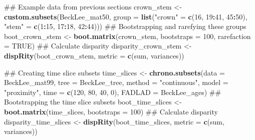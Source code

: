 \documentclass[]{book}
\newenvironment{Shaded}{\begin{snugshade}}{\end{snugshade}}
\newcommand{\KeywordTok}[1]{\textcolor[rgb]{0.13,0.29,0.53}{\textbf{#1}}}
\newcommand{\DataTypeTok}[1]{\textcolor[rgb]{0.13,0.29,0.53}{#1}}
\newcommand{\DecValTok}[1]{\textcolor[rgb]{0.00,0.00,0.81}{#1}}
\newcommand{\StringTok}[1]{\textcolor[rgb]{0.31,0.60,0.02}{#1}}
\newcommand{\OtherTok}[1]{\textcolor[rgb]{0.56,0.35,0.01}{#1}}
\newcommand{\OperatorTok}[1]{\textcolor[rgb]{0.81,0.36,0.00}{\textbf{#1}}}
\newcommand{\NormalTok}[1]{#1}
\theoremstyle{definition}
\theoremstyle{definition}
\theoremstyle{remark}
\begin{document}
\begin{Shaded}
\begin{Highlighting}[]
\NormalTok{## Example data from previous sections}
\NormalTok{crown_stem <-}\StringTok{ }\KeywordTok{custom.subsets}\NormalTok{(BeckLee_mat50,}
                                \DataTypeTok{group =} \KeywordTok{list}\NormalTok{(}\StringTok{"crown"}\NormalTok{ =}\StringTok{ }\KeywordTok{c}\NormalTok{(}\DecValTok{16}\NormalTok{, }\DecValTok{19}\OperatorTok{:}\DecValTok{41}\NormalTok{, }\DecValTok{45}\OperatorTok{:}\DecValTok{50}\NormalTok{), }
                                             \StringTok{"stem"}\NormalTok{ =}\StringTok{ }\KeywordTok{c}\NormalTok{(}\DecValTok{1}\OperatorTok{:}\DecValTok{15}\NormalTok{, }\DecValTok{17}\OperatorTok{:}\DecValTok{18}\NormalTok{, }\DecValTok{42}\OperatorTok{:}\DecValTok{44}\NormalTok{)))}
\NormalTok{## Bootstrapping and rarefying these groups}
\NormalTok{boot_crown_stem <-}\StringTok{ }\KeywordTok{boot.matrix}\NormalTok{(crown_stem, }\DataTypeTok{bootstraps =} \DecValTok{100}\NormalTok{, }\DataTypeTok{rarefaction =} \OtherTok{TRUE}\NormalTok{)}
\NormalTok{## Calculate disparity}
\NormalTok{disparity_crown_stem <-}\StringTok{ }\KeywordTok{dispRity}\NormalTok{(boot_crown_stem, }\DataTypeTok{metric =} \KeywordTok{c}\NormalTok{(sum, variances))}

\NormalTok{## Creating time slice subsets}
\NormalTok{time_slices <-}\StringTok{ }\KeywordTok{chrono.subsets}\NormalTok{(}\DataTypeTok{data =}\NormalTok{ BeckLee_mat99, }\DataTypeTok{tree =}\NormalTok{ BeckLee_tree, }
    \DataTypeTok{method =} \StringTok{"continuous"}\NormalTok{, }\DataTypeTok{model =} \StringTok{"proximity"}\NormalTok{, }\DataTypeTok{time =} \KeywordTok{c}\NormalTok{(}\DecValTok{120}\NormalTok{, }\DecValTok{80}\NormalTok{, }\DecValTok{40}\NormalTok{, }\DecValTok{0}\NormalTok{),}
    \DataTypeTok{FADLAD =}\NormalTok{ BeckLee_ages)}
\NormalTok{## Bootstrapping the time slice subsets}
\NormalTok{boot_time_slices <-}\StringTok{ }\KeywordTok{boot.matrix}\NormalTok{(time_slices, }\DataTypeTok{bootstraps =} \DecValTok{100}\NormalTok{)}
\NormalTok{## Calculate disparity}
\NormalTok{disparity_time_slices <-}\StringTok{ }\KeywordTok{dispRity}\NormalTok{(boot_time_slices, }\DataTypeTok{metric =} \KeywordTok{c}\NormalTok{(sum, variances))}


\end{Highlighting}
\end{Shaded}
\end{document}
